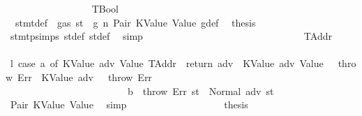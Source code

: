 \begin{isabellebody}
\isanewline
\ \ \ \ \ \ \ \ \ \ \ \ \ \ \ \ \isamarkupfalse%
\ TBool\isanewline
\ \ \ \ \ \ \ \ \ \ \ \ \ \ \ \ \isamarkupfalse%
\ {}{\isacharparenleft}{\kern0pt}{}{\isacharparenright}{\kern0pt}\ stmt{\isacharunderscore}{\kern0pt}def\ {\isacharbackquoteopen}{\isasymnot}\ gas\ st\ {\isasymle}\ g{\isacharbackquoteclose}\ n\ Pair\ KValue\ Value\ g{\isacharunderscore}{\kern0pt}def\ \isamarkupfalse%
\ {\isacharquery}{\kern0pt}thesis\ \isamarkupfalse%
\ stmt{\isachardot}{\kern0pt}psimps{\isacharparenleft}{\kern0pt}{}{\isacharparenright}{\kern0pt}\ st{\isacharprime}{\kern0pt}{\isacharunderscore}{\kern0pt}def\ st{\isacharprime}{\kern0pt}{\isacharprime}{\kern0pt}{\isacharunderscore}{\kern0pt}def\ \isamarkupfalse%
\ simp\isanewline
\ \ \ \ \ \ \ \ \ \ \ \ \ \ \isamarkupfalse%
\isanewline
\ \ \ \ \ \ \ \ \ \ \ \ \ \ \ \ \isamarkupfalse%
\ TAddr\isanewline
\ \ \ \ \ \ \ \ \ \ \ \ \ \ \ \ \isamarkupfalse%
\ \isamarkupfalse%
\ l{}{\isacharcolon}{\kern0pt}\ {\isachardoublequoteopen}{\isacharparenleft}{\kern0pt}case\ a{}\ of\ {\isacharparenleft}{\kern0pt}KValue\ adv{\isacharcomma}{\kern0pt}\ Value\ TAddr{\isacharparenright}{\kern0pt}\ {\isasymRightarrow}\ return\ adv\ {\isacharbar}{\kern0pt}\ {\isacharparenleft}{\kern0pt}KValue\ adv{\isacharcomma}{\kern0pt}\ Value\ {\isacharunderscore}{\kern0pt}{\isacharparenright}{\kern0pt}\ {\isasymRightarrow}\ throw\ Err\ {\isacharbar}{\kern0pt}\ {\isacharparenleft}{\kern0pt}KValue\ adv{\isacharcomma}{\kern0pt}\ {\isacharunderscore}{\kern0pt}{\isacharparenright}{\kern0pt}\ {\isasymRightarrow}\ throw\ Err\isanewline
\ \ \ \ \ \ \ \ \ \ \ \ \ \ \ \ \ \ \ \ \ \ \ {\isacharbar}{\kern0pt}\ {\isacharparenleft}{\kern0pt}{\isacharunderscore}{\kern0pt}{\isacharcomma}{\kern0pt}\ b{\isacharparenright}{\kern0pt}\ {\isasymRightarrow}\ throw\ Err{\isacharparenright}{\kern0pt}\ st{\isacharprime}{\kern0pt}{\isacharprime}{\kern0pt}\ {\isacharequal}{\kern0pt}\ Normal\ {\isacharparenleft}{\kern0pt}adv{\isacharcomma}{\kern0pt}\ st{\isacharprime}{\kern0pt}{\isacharprime}{\kern0pt}{\isacharparenright}{\kern0pt}{\isachardoublequoteclose}\ \isamarkupfalse%
\ Pair\ KValue\ Value\ \isamarkupfalse%
\ simp\isanewline
\ \ \ \ \ \ \ \ \ \ \ \ \ \ \ \ \isamarkupfalse%
\ \isamarkupfalse%
\ {\isacharquery}{\kern0pt}thesis\isanewline
\ \ \ \ \ \ \ \ \ \ \ \ \ \ \ \ \isamarkupfalse%

\end{isabellebody}
